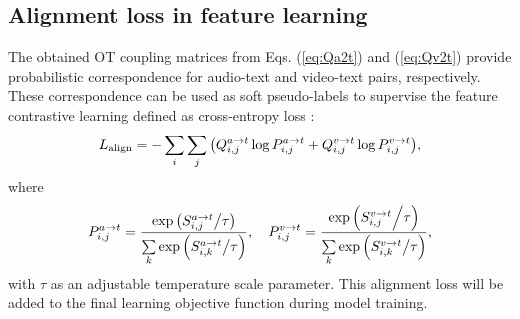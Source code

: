 \documentclass[conference]{IEEEtran}
\begin{document}
\subsection{Alignment loss in feature learning}
The obtained OT coupling matrices from Eqs. (\ref{eq:Qa2t}) and (\ref{eq:Qv2t}) provide probabilistic correspondence for audio-text and video-text pairs, respectively. These correspondence can be used as soft pseudo-labels to supervise the feature contrastive learning defined as cross-entropy loss \cite{ContrastiveCluster2020}:
\begin{equation}
	L_{\rm align}  =  - \sum\limits_i {\sum\limits_j {\left( {Q_{i,j}^{a \to t } \log P_{i,j}^{a \to t}  + Q_{i,j}^{v \to t } \log P_{i,j}^{v \to t} } \right)} },
\end{equation}
where 
\begin{equation}
	P_{i,j}^{a \to t}  = \frac{{\exp \left( {{{S_{i,j}^{a \to t } } \mathord{\left/
						{\vphantom {{S_{i,j}^{a \to t } } \tau }} \right.
						\kern-\nulldelimiterspace} \tau }} \right)}}{{\sum\limits_k {\exp \left( {{{S_{i,k}^{a \to t } } \mathord{\left/
							{\vphantom {{S_{i,j}^{a \to t } } \tau }} \right.
							\kern-\nulldelimiterspace} \tau }} \right)} }},\quad P_{i,j}^{v \to t}  = \frac{{\exp \left( {{{S_{i,j}^{v \to t } } \mathord{\left/
						{\vphantom {{S_{i,j}^{^{v \to t} } } \tau }} \right.
						\kern-\nulldelimiterspace} \tau }} \right)}}{{\sum\limits_k {\exp \left( {{{S_{i,k}^{v \to t } } \mathord{\left/
							{\vphantom {{S_{i,j}^{v \to t } } \tau }} \right.
							\kern-\nulldelimiterspace} \tau }} \right)} }},
						\label{eq:tempscale}
\end{equation}
with $\tau$ as an adjustable temperature scale parameter. This alignment loss will be added to the final learning objective function during model training.
\end{document}
